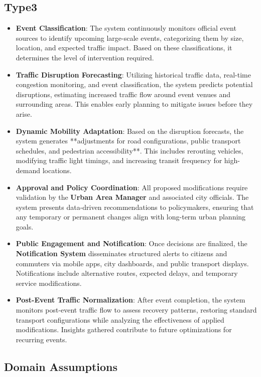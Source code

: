 \documentclass[a4paper,12pt]{article}
\begin{document}
\subsection*{Type3}
\begin{itemize}
    \item \textbf{Event Classification}: The system continuously monitors official event sources to identify upcoming large-scale events, categorizing them by size, location, and expected traffic impact. Based on these classifications, it determines the level of intervention required.
    \item \textbf{Traffic Disruption Forecasting}: Utilizing historical traffic data, real-time congestion monitoring, and event classification, the system predicts potential disruptions, estimating increased traffic flow around event venues and surrounding areas. This enables early planning to mitigate issues before they arise.
    \item \textbf{Dynamic Mobility Adaptation}: Based on the disruption forecasts, the system generates **adjustments for road configurations, public transport schedules, and pedestrian accessibility**. This includes rerouting vehicles, modifying traffic light timings, and increasing transit frequency for high-demand locations.
    \item \textbf{Approval and Policy Coordination}: All proposed modifications require validation by the \textbf{Urban Area Manager} and associated city officials. The system presents data-driven recommendations to policymakers, ensuring that any temporary or permanent changes align with long-term urban planning goals.
    \item \textbf{Public Engagement and Notification}: Once decisions are finalized, the \textbf{Notification System} disseminates structured alerts to citizens and commuters via mobile apps, city dashboards, and public transport displays. Notifications include alternative routes, expected delays, and temporary service modifications.
    \item \textbf{Post-Event Traffic Normalization}: After event completion, the system monitors post-event traffic flow to assess recovery patterns, restoring standard transport configurations while analyzing the effectiveness of applied modifications. Insights gathered contribute to future optimizations for recurring events.
\end{itemize}

\newpage

\subsection{Domain Assumptions}
\end{document}
